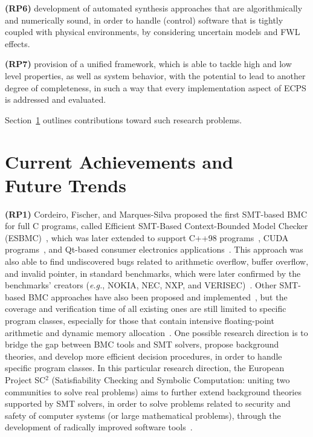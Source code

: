 \documentclass[format=acmsmall, review=false, screen=true]{acmart}
\begin{document}
\textbf{(RP6)} development of automated synthesis approaches that are algorithmically and numerically sound, in order to handle (control) software that is tightly coupled with physical environments, by considering uncertain models and FWL effects.

\textbf{(RP7)} provision of a unified framework, which is able to tackle high and low level properties, as well as system behavior, with the potential to lead to another degree of completeness, in such a way that every implementation aspect of ECPS is addressed and evaluated.

Section~\ref{achievements} outlines contributions toward such research problems.

\section{Current Achievements and \\ Future Trends}
\label{achievements}

\textbf{(RP1)} Cordeiro, Fischer, and Marques-Silva proposed the first SMT-based BMC for full C programs, called Efficient SMT-Based Context-Bounded Model Checker (ESBMC)~\cite{Cordeiro12}, which was later extended to support C++98 programs~\cite{ECBS13}, CUDA programs~\cite{cudalucas,Pereira17}, and Qt-based consumer electronics applications~\cite{Sousa15}. This approach was also able to find undiscovered bugs related to arithmetic overflow, buffer overflow, and invalid pointer, in standard benchmarks, which were later confirmed by the benchmarks' creators ({\it e.g.}, NOKIA, NEC, NXP, and VERISEC)~\cite{CordeiroF11,Cordeiro12}. Other SMT-based BMC approaches have also been proposed and implemented~\cite{MerzFS12}, but the coverage and verification time of all existing ones are still limited to specific program classes, especially for those that contain intensive floating-point arithmetic and dynamic memory allocation~\cite{Beyer14,BeyerSVCOMP15}. One possible research direction is to bridge the gap between BMC tools and SMT solvers, propose background theories, and develop more efficient decision procedures, in order to handle specific program classes. In this particular research direction, the European Project SC$^2$ (Satisfiability Checking and Symbolic Computation: uniting two communities to solve real problems) aims to further extend background theories supported by SMT solvers, in order to solve problems related to security and safety of computer systems (or large mathematical problems), through the development of radically improved software tools~\cite{DBLP:journals/cca/AbrahamA0BBBCDE16}.
\end{document}

